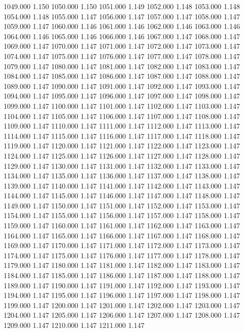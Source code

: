 1049.000 1.150 
1050.000 1.150 
1051.000 1.149 
1052.000 1.148 
1053.000 1.148 
1054.000 1.148 
1055.000 1.147 
1056.000 1.147 
1057.000 1.147 
1058.000 1.147 
1059.000 1.147 
1060.000 1.146 
1061.000 1.146 
1062.000 1.146 
1063.000 1.146 
1064.000 1.146 
1065.000 1.146 
1066.000 1.146 
1067.000 1.147 
1068.000 1.147 
1069.000 1.147 
1070.000 1.147 
1071.000 1.147 
1072.000 1.147 
1073.000 1.147 
1074.000 1.147 
1075.000 1.147 
1076.000 1.147 
1077.000 1.147 
1078.000 1.147 
1079.000 1.147 
1080.000 1.147 
1081.000 1.147 
1082.000 1.147 
1083.000 1.147 
1084.000 1.147 
1085.000 1.147 
1086.000 1.147 
1087.000 1.147 
1088.000 1.147 
1089.000 1.147 
1090.000 1.147 
1091.000 1.147 
1092.000 1.147 
1093.000 1.147 
1094.000 1.147 
1095.000 1.147 
1096.000 1.147 
1097.000 1.147 
1098.000 1.147 
1099.000 1.147 
1100.000 1.147 
1101.000 1.147 
1102.000 1.147 
1103.000 1.147 
1104.000 1.147 
1105.000 1.147 
1106.000 1.147 
1107.000 1.147 
1108.000 1.147 
1109.000 1.147 
1110.000 1.147 
1111.000 1.147 
1112.000 1.147 
1113.000 1.147 
1114.000 1.147 
1115.000 1.147 
1116.000 1.147 
1117.000 1.147 
1118.000 1.147 
1119.000 1.147 
1120.000 1.147 
1121.000 1.147 
1122.000 1.147 
1123.000 1.147 
1124.000 1.147 
1125.000 1.147 
1126.000 1.147 
1127.000 1.147 
1128.000 1.147 
1129.000 1.147 
1130.000 1.147 
1131.000 1.147 
1132.000 1.147 
1133.000 1.147 
1134.000 1.147 
1135.000 1.147 
1136.000 1.147 
1137.000 1.147 
1138.000 1.147 
1139.000 1.147 
1140.000 1.147 
1141.000 1.147 
1142.000 1.147 
1143.000 1.147 
1144.000 1.147 
1145.000 1.147 
1146.000 1.147 
1147.000 1.147 
1148.000 1.147 
1149.000 1.147 
1150.000 1.147 
1151.000 1.147 
1152.000 1.147 
1153.000 1.147 
1154.000 1.147 
1155.000 1.147 
1156.000 1.147 
1157.000 1.147 
1158.000 1.147 
1159.000 1.147 
1160.000 1.147 
1161.000 1.147 
1162.000 1.147 
1163.000 1.147 
1164.000 1.147 
1165.000 1.147 
1166.000 1.147 
1167.000 1.147 
1168.000 1.147 
1169.000 1.147 
1170.000 1.147 
1171.000 1.147 
1172.000 1.147 
1173.000 1.147 
1174.000 1.147 
1175.000 1.147 
1176.000 1.147 
1177.000 1.147 
1178.000 1.147 
1179.000 1.147 
1180.000 1.147 
1181.000 1.147 
1182.000 1.147 
1183.000 1.147 
1184.000 1.147 
1185.000 1.147 
1186.000 1.147 
1187.000 1.147 
1188.000 1.147 
1189.000 1.147 
1190.000 1.147 
1191.000 1.147 
1192.000 1.147 
1193.000 1.147 
1194.000 1.147 
1195.000 1.147 
1196.000 1.147 
1197.000 1.147 
1198.000 1.147 
1199.000 1.147 
1200.000 1.147 
1201.000 1.147 
1202.000 1.147 
1203.000 1.147 
1204.000 1.147 
1205.000 1.147 
1206.000 1.147 
1207.000 1.147 
1208.000 1.147 
1209.000 1.147 
1210.000 1.147 
1211.000 1.147 
